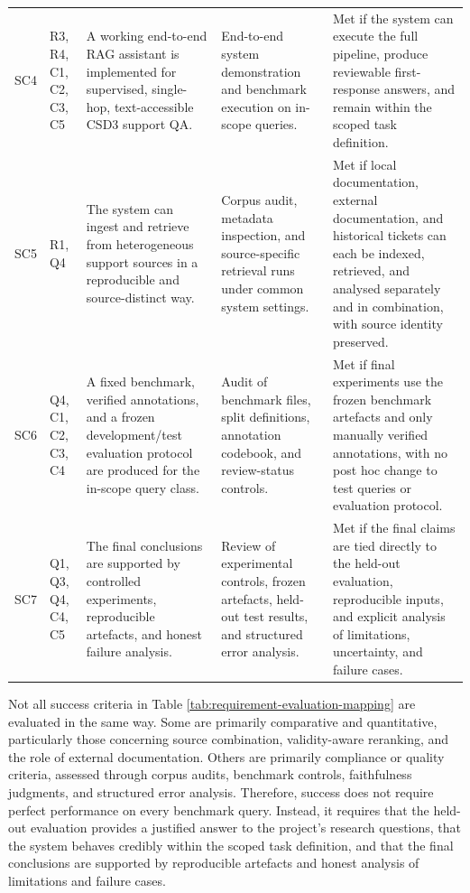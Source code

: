 \begin{longtable}{p{0.9cm} p{1.7cm} p{4.2cm} p{4.0cm} p{4.3cm}}
SC4 &
R3, R4, C1, C2, C3, C5 &
A working end-to-end RAG assistant is implemented for supervised, single-hop, text-accessible CSD3 support QA. &
End-to-end system demonstration and benchmark execution on in-scope queries. &
Met if the system can execute the full pipeline, produce reviewable first-response answers, and remain within the scoped task definition. \\

SC5 &
R1, Q4 &
The system can ingest and retrieve from heterogeneous support sources in a reproducible and source-distinct way. &
Corpus audit, metadata inspection, and source-specific retrieval runs under common system settings. &
Met if local documentation, external documentation, and historical tickets can each be indexed, retrieved, and analysed separately and in combination, with source identity preserved. \\

SC6 &
Q4, C1, C2, C3, C4 &
A fixed benchmark, verified annotations, and a frozen development/test evaluation protocol are produced for the in-scope query class. &
Audit of benchmark files, split definitions, annotation codebook, and review-status controls. &
Met if final experiments use the frozen benchmark artefacts and only manually verified annotations, with no post hoc change to test queries or evaluation protocol. \\

SC7 &
Q1, Q3, Q4, C4, C5 &
The final conclusions are supported by controlled experiments, reproducible artefacts, and honest failure analysis. &
Review of experimental controls, frozen artefacts, held-out test results, and structured error analysis. &
Met if the final claims are tied directly to the held-out evaluation, reproducible inputs, and explicit analysis of limitations, uncertainty, and failure cases. \\

\end{longtable}
\endgroup

Not all success criteria in Table \ref{tab:requirement-evaluation-mapping} are evaluated in the same way. Some are primarily comparative and quantitative, particularly those concerning source combination, validity-aware reranking, and the role of external documentation. Others are primarily compliance or quality criteria, assessed through corpus audits, benchmark controls, faithfulness judgments, and structured error analysis. Therefore, success does not require perfect performance on every benchmark query. Instead, it requires that the held-out evaluation provides a justified answer to the project's research questions, that the system behaves credibly within the scoped task definition, and that the final conclusions are supported by reproducible artefacts and honest analysis of limitations and failure cases.

